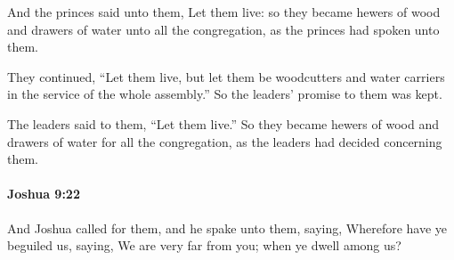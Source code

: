 			\begin{versebox}
					\item[BHS] 
					\item[ASV] And the princes said unto them, Let them live: so they became hewers of wood and drawers of water unto all the congregation, as the princes had spoken unto them.
					\item[NIV] They continued, “Let them live, but let them be woodcutters and water carriers in the service of the whole assembly.” So the leaders’ promise to them was kept.
					\item[NRSV] The leaders said to them, “Let them live.” So they became hewers of wood and drawers of water for all the congregation, as the leaders had decided concerning them.
			\end{versebox}

		\paragraph{Joshua 9:22} %
			\label{JOSHUA-9-22}

			And Joshua called for them, and he spake unto them, saying, Wherefore have ye beguiled us, saying, We are very far from you; when ye dwell among us?

